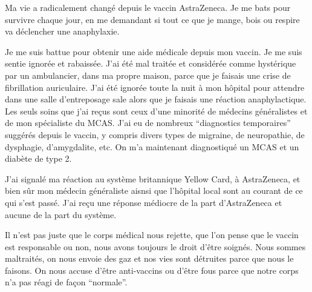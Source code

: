 Ma vie a radicalement changé depuis le vaccin AstraZeneca. Je me bats pour
survivre chaque jour, en me demandant si tout ce que je mange, bois ou respire
va déclencher une anaphylaxie.

Je me suis battue pour obtenir une aide médicale depuis mon vaccin. Je me suis
sentie ignorée et rabaissée. J'ai été mal traitée et considérée comme hystérique
par un ambulancier, dans ma propre maison, parce que je faisais une crise de
fibrillation auriculaire. J'ai été ignorée toute la nuit à mon hôpital pour
attendre dans une salle d'entreposage sale alors que je faisais une réaction
anaphylactique. Les seuls soins que j'ai reçus sont ceux d'une minorité de
médecins généralistes et de mon spécialiste du MCAS. J'ai eu de nombreux
“diagnostics temporaires” suggérés depuis le vaccin, y compris divers types de
migraine, de neuropathie, de dysphagie, d'amygdalite, etc. On m'a maintenant
diagnostiqué un MCAS et un diabète de type 2.

J'ai signalé ma réaction au système britannique Yellow Card, à AstraZeneca, et
bien sûr mon médecin généraliste aisnsi que l'hôpital local sont au courant de
ce qui s'est passé. J'ai reçu une réponse médiocre de la part d'AstraZeneca et
aucune de la part du système.

Il n'est pas juste que le corps médical nous rejette, que l'on pense que le
vaccin est responsable ou non, nous avons toujours le droit d'être soignés. Nous
sommes maltraités, on nous envoie des gaz et nos vies sont détruites parce que
nous le faisons. On nous accuse d'être anti-vaccins ou d'être fous parce que
notre corps n'a pas réagi de façon “normale”.

